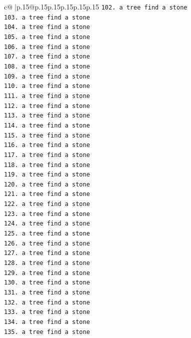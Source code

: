 \documentclass{article}
\begin{document}
{\begin{supertabular}{c@{$\;$}|p{.15\linewidth}@{}p{.15\linewidth}p{.15\linewidth}p{.15\linewidth}p{.15\linewidth}p{.15\linewidth}}
{{{\texttt{102. a tree find a stone} \\
\texttt{103. a tree find a stone} \\
\texttt{104. a tree find a stone} \\
\texttt{105. a tree find a stone} \\
\texttt{106. a tree find a stone} \\
\texttt{107. a tree find a stone} \\
\texttt{108. a tree find a stone} \\
\texttt{109. a tree find a stone} \\
\texttt{110. a tree find a stone} \\
\texttt{111. a tree find a stone} \\
\texttt{112. a tree find a stone} \\
\texttt{113. a tree find a stone} \\
\texttt{114. a tree find a stone} \\
\texttt{115. a tree find a stone} \\
\texttt{116. a tree find a stone} \\
\texttt{117. a tree find a stone} \\
\texttt{118. a tree find a stone} \\
\texttt{119. a tree find a stone} \\
\texttt{120. a tree find a stone} \\
\texttt{121. a tree find a stone} \\
\texttt{122. a tree find a stone} \\
\texttt{123. a tree find a stone} \\
\texttt{124. a tree find a stone} \\
\texttt{125. a tree find a stone} \\
\texttt{126. a tree find a stone} \\
\texttt{127. a tree find a stone} \\
\texttt{128. a tree find a stone} \\
\texttt{129. a tree find a stone} \\
\texttt{130. a tree find a stone} \\
\texttt{131. a tree find a stone} \\
\texttt{132. a tree find a stone} \\
\texttt{133. a tree find a stone} \\
\texttt{134. a tree find a stone} \\
\texttt{135. a tree find a stone} \\
}}}
\end{supertabular}}
\end{document}
